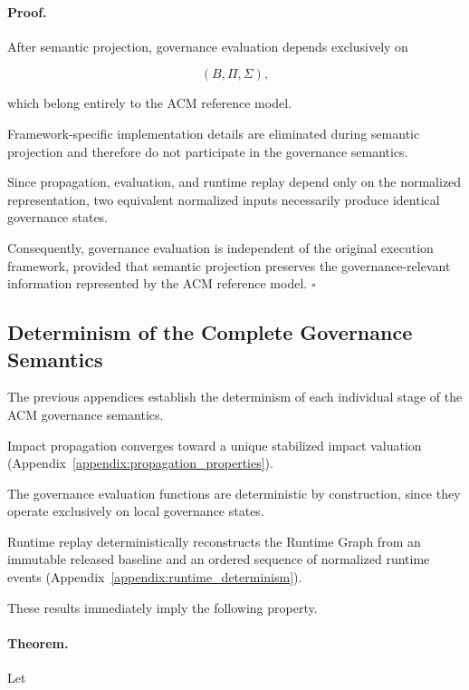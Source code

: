 \documentclass[10pt]{article}
\begin{document}
\paragraph*{Proof.}

After semantic projection, governance evaluation depends exclusively on

\[
(B,\Pi,\Sigma),
\]

which belong entirely to the ACM reference model.

Framework-specific implementation details are eliminated during semantic
projection and therefore do not participate in the governance semantics.

Since propagation, evaluation, and runtime replay depend only on the normalized
representation, two equivalent normalized inputs necessarily produce identical
governance states.

Consequently, governance evaluation is independent of the original execution
framework, provided that semantic projection preserves the governance-relevant
information represented by the ACM reference model.
\hfill$\square$

\subsection{Determinism of the Complete Governance Semantics}
\label{appendix:global_determinism}

The previous appendices establish the determinism of each individual stage of
the ACM governance semantics.

Impact propagation converges toward a unique stabilized impact valuation
(Appendix~\ref{appendix:propagation_properties}).

The governance evaluation functions are deterministic by construction, since
they operate exclusively on local governance states.

Runtime replay deterministically reconstructs the Runtime Graph from an
immutable released baseline and an ordered sequence of normalized runtime events
(Appendix~\ref{appendix:runtime_determinism}).

These results immediately imply the following property.

\paragraph*{Theorem.}

Let
\end{document}
